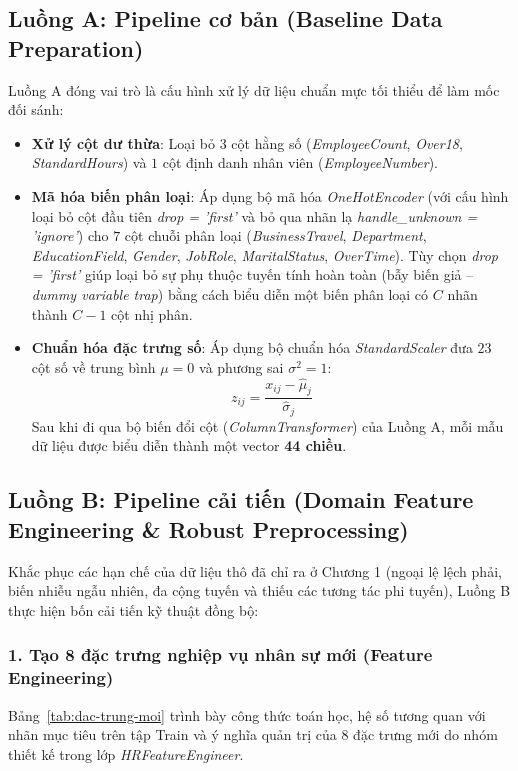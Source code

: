 \subsection{Luồng A: Pipeline cơ bản (Baseline Data Preparation)}
Luồng A đóng vai trò là cấu hình xử lý dữ liệu chuẩn mực tối thiểu để làm mốc đối sánh:
\begin{itemize}
    \item \textbf{Xử lý cột dư thừa}: Loại bỏ $3$ cột hằng số (\textit{EmployeeCount}, \textit{Over18}, \textit{StandardHours}) và $1$ cột định danh nhân viên (\textit{EmployeeNumber}).
    \item \textbf{Mã hóa biến phân loại}: Áp dụng bộ mã hóa \textit{OneHotEncoder} (với cấu hình loại bỏ cột đầu tiên \textit{drop = 'first'} và bỏ qua nhãn lạ \textit{handle\_unknown = 'ignore'}) cho $7$ cột chuỗi phân loại (\textit{BusinessTravel}, \textit{Department}, \textit{EducationField}, \textit{Gender}, \textit{JobRole}, \textit{MaritalStatus}, \textit{OverTime}). Tùy chọn \textit{drop = 'first'} giúp loại bỏ sự phụ thuộc tuyến tính hoàn toàn (bẫy biến giả -- \textit{dummy variable trap}) bằng cách biểu diễn một biến phân loại có $C$ nhãn thành $C-1$ cột nhị phân.
    \item \textbf{Chuẩn hóa đặc trưng số}: Áp dụng bộ chuẩn hóa \textit{StandardScaler} đưa $23$ cột số về trung bình $\mu = 0$ và phương sai $\sigma^2 = 1$:
    \[
        z_{ij} = \frac{x_{ij} - \hat{\mu}_j}{\hat{\sigma}_j}
    \]
    Sau khi đi qua bộ biến đổi cột (\textit{ColumnTransformer}) của Luồng A, mỗi mẫu dữ liệu được biểu diễn thành một vector \textbf{44 chiều}.
\end{itemize}

\subsection{Luồng B: Pipeline cải tiến (Domain Feature Engineering \& Robust Preprocessing)}
Khắc phục các hạn chế của dữ liệu thô đã chỉ ra ở Chương 1 (ngoại lệ lệch phải, biến nhiễu ngẫu nhiên, đa cộng tuyến và thiếu các tương tác phi tuyến), Luồng B thực hiện bốn cải tiến kỹ thuật đồng bộ:

\subsubsection{1. Tạo 8 đặc trưng nghiệp vụ nhân sự mới (Feature Engineering)}
Bảng~\ref{tab:dac-trung-moi} trình bày công thức toán học, hệ số tương quan với nhãn mục tiêu trên tập Train và ý nghĩa quản trị của $8$ đặc trưng mới do nhóm thiết kế trong lớp \textit{HRFeatureEngineer}.

